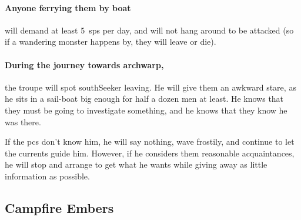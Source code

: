 \begin{multicols}{2}
\paragraph{Anyone ferrying them by boat}
will demand at least 5~\glspl{sp} per day, and will not hang around to be attacked (so if a wandering monster happens by, they will leave or die).

\paragraph{During the journey towards \gls{archwarp},}
the troupe will spot \gls{southSeeker} leaving.
He will give them an awkward stare, as he sits in a sail-boat big enough for half a dozen men at least.
He knows that they must be going to investigate something, and he knows that they know he was there.

If the \glspl{pc} don't know him, he will say nothing, wave frostily, and continue to let the currents guide him.
However, if he considers them reasonable acquaintances, he will stop and arrange to get what he wants while giving away as little information as possible.

\southSeeker

\subsection{Campfire Embers}



\end{multicols}
